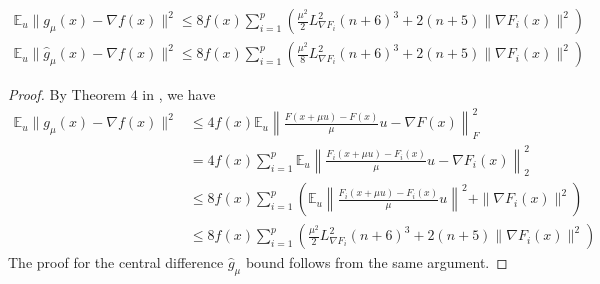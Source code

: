 \documentclass{article}
\begin{document}
\begin{theorem}
\begin{align}
\mathbb{E}_u\|g_{\mu}(x) - \nabla f(x)\|^2 \leq 8f(x)\sum_{i=1}^p\left(\frac{\mu^2}{2}L_{\nabla F_i}^2(n+6)^3 + 2(n+5)\|\nabla F_i(x)\|^2\right)
\end{align}
\begin{align}
\mathbb{E}_u\|\hat{g}_{\mu}(x) - \nabla f(x)\|^2 \leq 8f(x)\sum_{i=1}^p\left(\frac{\mu^2}{8}L_{\nabla F_i}^2(n+6)^3 + 2(n+5)\|\nabla F_i(x)\|^2\right)
\end{align}
\begin{proof}
By Theorem $4$ in \cite{Nesterov2015}, we have 
\begin{align*}
\mathbb{E}_u\|g_{\mu}(x) - \nabla f(x)\|^2 & \leq 4f(x)\mathbb{E}_u\left\| \frac{F(x+\mu u)-F(x)}{\mu}u - \nabla F(x) \right\|_F^2 \\ & = 4f(x) \sum_{i=1}^p\mathbb{E}_u\left\| \frac{F_i(x+\mu u)-F_i(x)}{\mu}u - \nabla F_i(x) \right\|_2^2 \\ & \leq 8 f(x)\sum_{i=1}^p\left(\mathbb{E}_u\left\| \frac{F_i(x+\mu u)-F_i(x)}{\mu}u \right\|^2 + \|\nabla F_i(x)\|^2 \right) \\ & \leq 8f(x)\sum_{i=1}^p\left(\frac{\mu^2}{2}L_{\nabla F_i}^2(n+6)^3 + 2(n+5)\|\nabla F_i(x)\|^2\right)
\end{align*}
The proof for the central difference $\hat{g}_{\mu}$ bound follows from the same argument. 
\end{proof}
\end{theorem}
\end{document}
